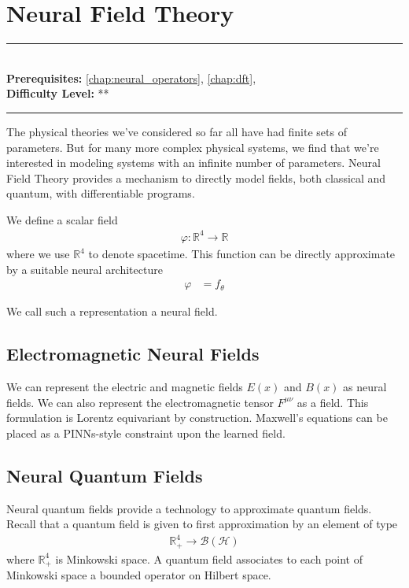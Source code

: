 \documentclass[book.tex]{subfiles}
\begin{document}
\chapter{Neural Field Theory}

\label{chap:neural_quantum_fields}
\noindent\rule{11cm}{0.4pt} \\
\textbf{Prerequisites:} \autoref{chap:neural_operators}, \autoref{chap:dft},  \\
\textbf{Difficulty Level:} ** \\
\noindent\rule{11cm}{0.4pt}
\vspace{5mm}

The physical theories we've considered so far all have had finite sets of parameters. But for many more complex physical systems, we find that we're interested in modeling systems with an infinite number of parameters. Neural Field Theory provides a mechanism to directly model fields, both classical and quantum, with differentiable programs.


We define a scalar field 
\begin{align} 
\varphi: \mathbb{R}^4 \to \mathbb{R}
\end{align}
where we use $\mathbb{R}^4$ to denote spacetime. This function can be directly approximate by a suitable neural architecture
\begin{align}
\varphi &= f_\theta
\end{align}

We call such a representation a neural field.

\section{Electromagnetic Neural Fields}

We can represent the electric and magnetic fields $E(x)$ and $B(x)$ as neural fields. We can also represent the electromagnetic tensor $F^{\mu \nu}$ as a field. This formulation is Lorentz equivariant by construction. Maxwell's equations can be placed as a PINNs-style constraint upon the learned field.

\section{Neural Quantum Fields}

Neural quantum fields provide a technology to approximate quantum fields. Recall that a quantum field is given to first approximation by an element of type
\begin{align}
    \mathbb{R}^4_+ \to \mathcal{B}(\mathcal{H})
\end{align}
where $\mathbb{R}^4_+$ is Minkowski space. A quantum field associates to each point of Minkowski space a bounded operator on Hilbert space. 
\end{document}
